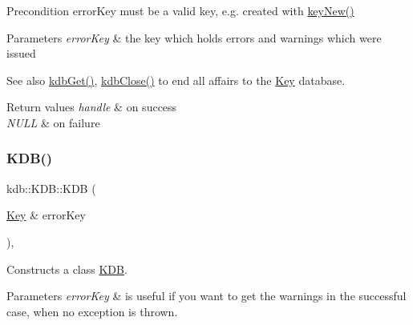 \begin{DoxyPrecond}{Precondition}
error\+Key must be a valid key, e.\+g. created with \hyperlink{group__key_gad23c65b44bf48d773759e1f9a4d43b89}{key\+New()}
\end{DoxyPrecond}

\begin{DoxyParams}{Parameters}
{\em error\+Key} & the key which holds errors and warnings which were issued \\
\hline
\end{DoxyParams}
\begin{DoxySeeAlso}{See also}
\hyperlink{group__kdb_ga28e385fd9cb7ccfe0b2f1ed2f62453a1}{kdb\+Get()}, \hyperlink{group__kdb_gadb54dc9fda17ee07deb9444df745c96f}{kdb\+Close()} to end all affairs to the \hyperlink{group__key}{Key} database. 
\end{DoxySeeAlso}

\begin{DoxyRetVals}{Return values}
{\em handle} & on success \\
\hline
{\em N\+U\+LL} & on failure \\
\hline
\end{DoxyRetVals}
\mbox{\label{classkdb_1_1KDB_a98e25c7fe2f47c5a90461676c6d219e7}} 
\subsubsection{\texorpdfstring{K\+D\+B()}{KDB()}\hspace{0.1cm}{\footnotesize\ttfamily [2/2]}}
{\footnotesize\ttfamily kdb\+::\+K\+D\+B\+::\+K\+DB (\begin{DoxyParamCaption}\item[{\hyperlink{classkdb_1_1Key}{Key} \&}]{error\+Key }\end{DoxyParamCaption})\hspace{0.3cm}{\ttfamily [inline]}, {\ttfamily [explicit]}}



Constructs a class \hyperlink{classkdb_1_1KDB}{K\+DB}. 


\begin{DoxyParams}{Parameters}
{\em error\+Key} & is useful if you want to get the warnings in the successful case, when no exception is thrown.\\
\hline
\end{DoxyParams}

